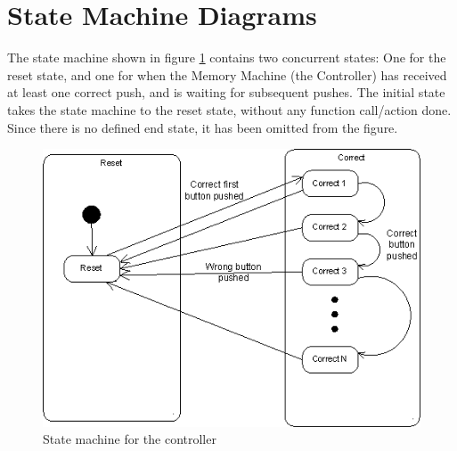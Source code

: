 \documentclass{article}
\begin{document}
\section{State Machine Diagrams}
The state machine shown in figure \ref{fig:state} contains two concurrent states: One for the reset
state, and one for when the Memory Machine (the Controller) has received at
least one correct push, and is waiting for subsequent pushes. The initial state
takes the state machine to the reset state, without any function call/action
done. Since there is no defined end state, it has been omitted from the figure.
\begin{figure}[htbp]
  \centering
  \includegraphics[width=\linewidth]{../state_hierarchical}
  \caption{State machine for the controller}
  \label{fig:state}
\end{figure}
  
\end{document}
